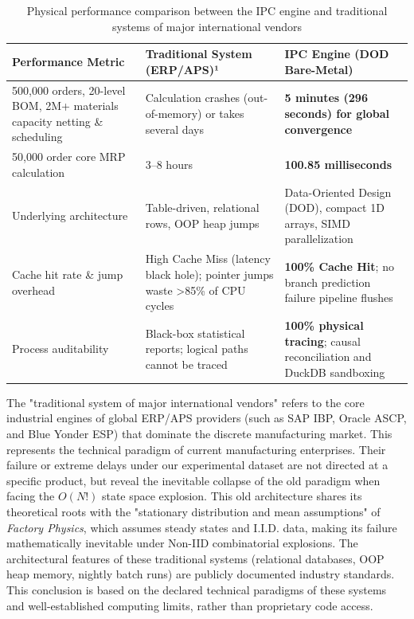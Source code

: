 \documentclass[11pt,a4paper]{article}
\begin{document}
\begin{table}[htbp]
\centering
\begin{threeparttable}
\caption{Physical performance comparison between the IPC engine and traditional systems of major international vendors}
\label{tab:performance_comparison}
\begin{tabular}{p{4.5cm}p{4.5cm}p{4.5cm}}
\toprule
\textbf{Performance Metric} & \textbf{Traditional System (ERP/APS)}¹ & \textbf{IPC Engine (DOD Bare-Metal)} \\
\midrule
500,000 orders, 20-level BOM, 2M+ materials capacity netting \& scheduling & Calculation crashes (out-of-memory) or takes several days & \textbf{5 minutes (296 seconds) for global convergence} \\
\midrule
50,000 order core MRP calculation & 3–8 hours & \textbf{100.85 milliseconds} \\
\midrule
Underlying architecture & Table-driven, relational rows, OOP heap jumps & Data-Oriented Design (DOD), compact 1D arrays, SIMD parallelization \\
\midrule
Cache hit rate \& jump overhead & High Cache Miss (latency black hole); pointer jumps waste >85\% of CPU cycles & \textbf{100\% Cache Hit}; no branch prediction failure pipeline flushes \\
\midrule
Process auditability & Black-box statistical reports; logical paths cannot be traced & \textbf{100\% physical tracing}; causal reconciliation and DuckDB sandboxing \\
\bottomrule
\end{tabular}
\begin{tablenotes}
\footnotesize
\item[1] The "traditional system of major international vendors" refers to the core industrial engines of global ERP/APS providers (such as SAP IBP, Oracle ASCP, and Blue Yonder ESP) that dominate the discrete manufacturing market. This represents the technical paradigm of current manufacturing enterprises. Their failure or extreme delays under our experimental dataset are not directed at a specific product, but reveal the inevitable collapse of the old paradigm when facing the $O(N!)$ state space explosion. This old architecture shares its theoretical roots with the "stationary distribution and mean assumptions" of \emph{Factory Physics}, which assumes steady states and I.I.D. data, making its failure mathematically inevitable under Non-IID combinatorial explosions. The architectural features of these traditional systems (relational databases, OOP heap memory, nightly batch runs) are publicly documented industry standards. This conclusion is based on the declared technical paradigms of these systems and well-established computing limits, rather than proprietary code access.
\end{tablenotes}
\end{threeparttable}
\end{table}
\end{document}
